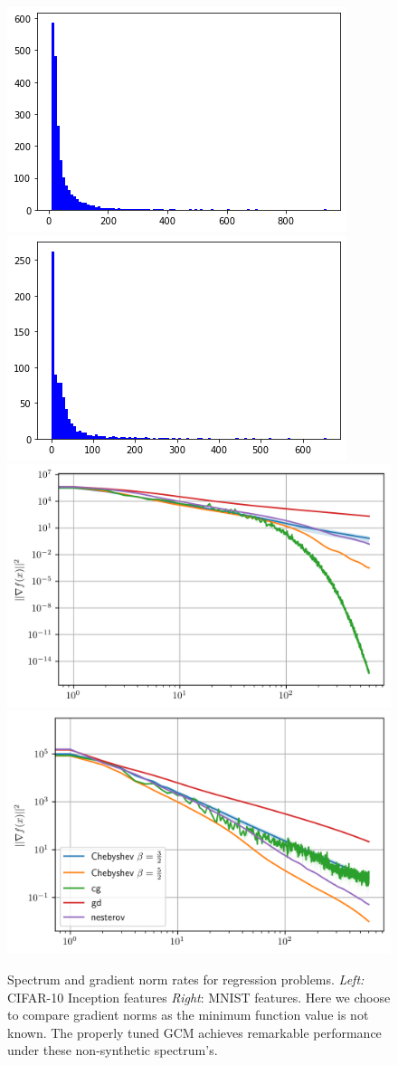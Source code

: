 \documentclass{article}
\begin{document}
\begin{figure}
    \centering
    \includegraphics[width=5 cm]{imgs/inception/spectrum.png}\includegraphics[width= 5 cm]{imgs/mnist/spectrum.png}
    \includegraphics[width=5 cm]{new_imgs/inception.png}\includegraphics[width= 5 cm]{new_imgs/mnist.png}
    
    
    \caption{Spectrum and gradient norm rates for regression problems. \textit{Left:} CIFAR-10 Inception features \textit{Right}: MNIST features. Here we choose to compare gradient norms as the minimum function value is not known. The properly tuned GCM achieves remarkable performance under these non-synthetic spectrum's.
}
    \label{fig:my_label}
\end{figure}
\end{document}
